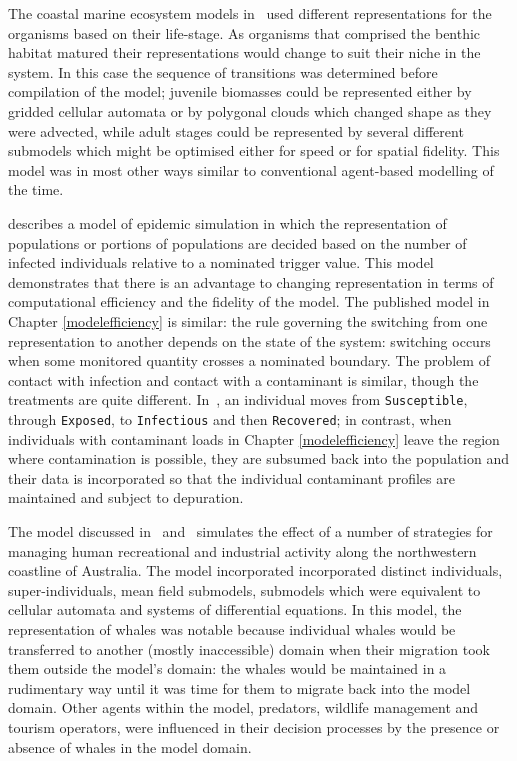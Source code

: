 The coastal marine ecosystem models in~\cite{Gray06:1} used different
representations for the organisms based on their life-stage. As
organisms that comprised the benthic habitat matured their
representations would change to suit their niche in the system.  In
this case the sequence of transitions was determined before
compilation of the model; juvenile biomasses could be represented
either by gridded cellular automata or by polygonal clouds which
changed shape as they were advected, while adult stages could be
represented by several different submodels which might be optimised
either for speed or for spatial fidelity.  This model was in most
other ways similar to conventional agent-based modelling of the time.


\cite{bobashev2007hybrid} describes a model of epidemic simulation in
which the representation of populations or portions of populations are
decided based on the number of infected individuals relative to a
nominated trigger value. This model demonstrates that there is an
advantage to changing representation in terms of computational
efficiency and the fidelity of the model. The published model in Chapter
\ref{modelefficiency} is similar: the rule governing the switching
from one representation to another depends on the state of the system:
switching occurs when some monitored quantity crosses a nominated
boundary. The problem of contact with infection and contact with a
contaminant is similar, though the treatments are quite
different. In~\citet{bobashev2007hybrid}, an individual moves
from \texttt{Susceptible}, through \texttt{Exposed},
to \texttt{Infectious} and then \texttt{Recovered}; in contrast, when
individuals with contaminant loads in Chapter \ref{modelefficiency}
leave the region where contamination is possible, they are subsumed
back into the population and their data is incorporated so that the
individual contaminant profiles are maintained and subject to
depuration. 

The model discussed in~\cite{Gray2014}
and~\cite{Fulton2009crossingscales} simulates the effect of a number
of strategies for managing human recreational and industrial activity
along the northwestern coastline of Australia. The model incorporated
incorporated distinct individuals, super-individuals, mean field
submodels, submodels which were equivalent to cellular automata and
systems of differential equations. In this model, the representation
of whales was notable because individual whales would be transferred
to another (mostly inaccessible) domain when their migration took them
outside the model's domain: the whales would be maintained in a
rudimentary way until it was time for them to migrate back into the
model domain. Other agents within the model, predators, wildlife
management and tourism operators, were influenced in their decision
processes by the presence or absence of whales in the model domain.

